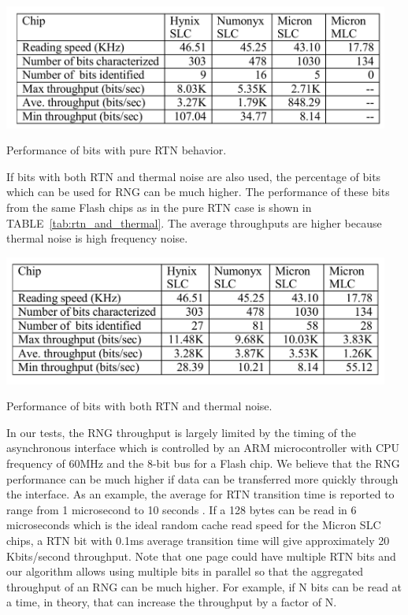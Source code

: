 \begin{table}
  \begin{center}
    \includegraphics[width=5in]{figs/pure_rtn.png} 
  \end{center}
\caption{Performance of bits with pure RTN behavior.}
\vspace{-0.2in}
\label{tab:pure_rtn}
\end{table}

If bits with both RTN and thermal noise are also used, the percentage of bits which can be used for RNG can be much higher. The performance of these bits from the same Flash chips as in the pure RTN case is shown in TABLE~\ref{tab:rtn_and_thermal}. The average throughputs are higher because thermal noise is high frequency noise.

\begin{table}
  \begin{center}
    \includegraphics[width=5in]{figs/rtn_and_thermal.png} 
  \end{center}
\caption{Performance of bits with both RTN and thermal noise.}
\vspace{-0.2in}
\label{tab:rtn_and_thermal}
\end{table}

In our tests, the RNG throughput is largely limited by the timing of the asynchronous interface which is controlled by an ARM microcontroller with CPU frequency of 60MHz and the 8-bit bus for a Flash chip. We believe that the RNG performance can be much higher if data can be transferred more quickly through the interface. As an example, the average for RTN transition time is reported to range from 1 microsecond to 10 seconds \cite{abe2011understanding}. If a 128 bytes can be read in 6 microseconds which is the ideal random cache read speed for the Micron SLC chips, a RTN bit with 0.1ms average transition time will give approximately 20 Kbits/second throughput. Note that one page could have multiple RTN bits and our algorithm allows using multiple bits in parallel so that the aggregated throughput of an RNG can be much higher. For example, if N bits can be read at a time, in theory, that can increase the throughput by a factor of N. 

